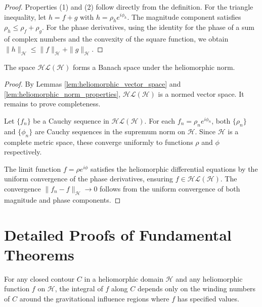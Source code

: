 \begin{proof}
Properties (1) and (2) follow directly from the definition. For the triangle inequality, let $h = f + g$ with $h = \rho_h e^{i\phi_h}$. The magnitude component satisfies $\rho_h \leq \rho_f + \rho_g$. For the phase derivatives, using the identity for the phase of a sum of complex numbers and the convexity of the square function, we obtain $\|h\|_{\mathcal{H}} \leq \|f\|_{\mathcal{H}} + \|g\|_{\mathcal{H}}$.
\end{proof}

\begin{theorem}
\label{thm:heliomorphic_banach_space}
The space $\mathcal{HL}(\mathcal{H})$ forms a Banach space under the heliomorphic norm.
\end{theorem}

\begin{proof}
By Lemmas \ref{lem:heliomorphic_vector_space} and \ref{lem:heliomorphic_norm_properties}, $\mathcal{HL}(\mathcal{H})$ is a normed vector space. It remains to prove completeness.

Let $\{f_n\}$ be a Cauchy sequence in $\mathcal{HL}(\mathcal{H})$. For each $f_n = \rho_n e^{i\phi_n}$, both $\{\rho_n\}$ and $\{\phi_n\}$ are Cauchy sequences in the supremum norm on $\mathcal{H}$. Since $\mathcal{H}$ is a complete metric space, these converge uniformly to functions $\rho$ and $\phi$ respectively.

The limit function $f = \rho e^{i\phi}$ satisfies the heliomorphic differential equations by the uniform convergence of the phase derivatives, ensuring $f \in \mathcal{HL}(\mathcal{H})$. The convergence $\|f_n - f\|_{\mathcal{H}} \to 0$ follows from the uniform convergence of both magnitude and phase components.
\end{proof}

\section{Detailed Proofs of Fundamental Theorems}

\begin{theorem}
For any closed contour $C$ in a heliomorphic domain $\mathcal{H}$ and any heliomorphic function $f$ on $\mathcal{H}$, the integral of $f$ along $C$ depends only on the winding numbers of $C$ around the gravitational influence regions where $f$ has specified values.
\end{theorem}

